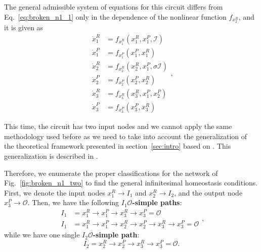 The general admissible system of equations for this circuit differs from 
Eq.~\ref{eq:broken_n1_1} only in the dependence of the nonlinear function 
$f_{x_2^R}$, and it is given as
\begin{equation}
    \begin{aligned}
        \dot{x}_1^R &= f_{x_1^R}(x_1^R, x_1^P, \mathcal{I})\\
        \dot{x}_1^P &= f_{x_1^P}(x_1^P, x_1^R)\\
        \dot{x}_2^R &= f_{x_2^R}(x_2^R, x_1^P, \sigma \mathcal{I})\\
        \dot{x}_2^P &= f_{x_2^P}(x_2^P, x_2^R)\\
        \dot{x}_3^R &= f_{x_3^R}(x_3^R, x_1^P, x_2^P)\\
        \dot{x}_3^P &= f_{x_3^P}(x_3^P, x_3^R)
    \end{aligned},
\end{equation}

This time, the circuit has two input nodes and we cannot apply the same methodology
used before as we need to take into account the generalization of the theoretical 
framework presented in section~\ref{sec:intro} based on \cite{wang2021}. This 
generalization is described in \cite{multi_input_antoneli2020}. 


Therefore, 
we enumerate the proper classifications for the network of 
Fig.~\ref{fig:broken_n1_two} to find the general infinitesimal homeostasis 
conditions. First, we denote the input nodes $x_1^R \rightarrow I_1$
and $x_2^R \rightarrow I_2$, and the output node $x_3^P \rightarrow \mathcal{O}$.
Then, we have the following \textbf{$I_1\mathcal{O}$-simple paths}:
\begin{equation}
    \begin{aligned}
        I_1 &= x_1^R \rightarrow x_1^P \rightarrow x_3^R
        \rightarrow x_3^P = \mathcal{O}\\
        I_1 &= x_1^R \rightarrow x_1^P \rightarrow x_2^R
        \rightarrow x_2^P \rightarrow x_3^R \rightarrow x_3^P
        = \mathcal{O}
    \end{aligned},
\end{equation}
while we have one single \textbf{$I_2\mathcal{O}$-simple path}:
\begin{equation}
    I_2 = x_2^R \rightarrow x_2^P \rightarrow x_3^R
    \rightarrow x_3^P = \mathcal{O}.
\end{equation}

